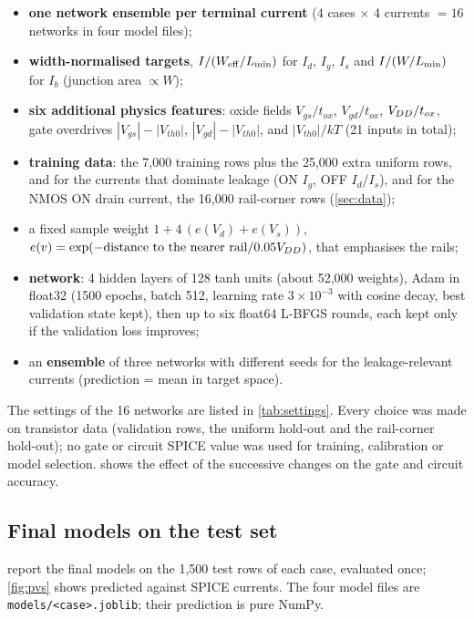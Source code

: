 \begin{itemize}
  \item \textbf{one network ensemble per terminal current} ($4$ cases $\times$ $4$ currents $=16$ networks in four model files);
  \item \textbf{width-normalised targets}, $I/(W_{\mathrm{eff}}/L_{\min})$ for $I_d$, $I_g$, $I_s$ and $I/(W/L_{\min})$ for $I_b$ (junction area $\propto W$);
  \item \textbf{six additional physics features}: oxide fields $V_{gs}/t_{ox}$, $V_{gd}/t_{ox}$, $V_{DD}/t_{ox}$, gate overdrives $|V_{gs}|-|V_{th0}|$,
        $|V_{gd}|-|V_{th0}|$, and $|V_{th0}|/kT$ (21 inputs in total);
  \item \textbf{training data}: the 7{,}000 training rows plus the 25{,}000 extra uniform rows, and for the currents that dominate leakage
        (ON $I_g$, OFF $I_d/I_s$), and for the NMOS ON drain current, the 16{,}000 rail-corner rows (\cref{sec:data});
  \item a fixed sample weight $1+4\,(e(V_d)+e(V_s))$, $e(v)=\exp(-\text{distance to the nearer rail}/0.05V_{DD})$, that emphasises the rails;
  \item \textbf{network}: 4 hidden layers of 128 tanh units (about 52{,}000 weights), Adam in float32 (1500 epochs, batch 512, learning rate
        $3\times10^{-3}$ with cosine decay, best validation state kept), then up to six float64 L-BFGS rounds, each kept only if the validation loss improves;
  \item an \textbf{ensemble} of three networks with different seeds for the leakage-relevant currents (prediction = mean in target space).
\end{itemize}
The settings of the 16 networks are listed in \cref{tab:settings}. Every choice was made on transistor data (validation rows, the uniform hold-out and the
rail-corner hold-out); no gate or circuit SPICE value was used for training, calibration or model selection.  shows the effect of
the successive changes on the gate and circuit accuracy.



\subsection{Final models on the test set}\label{sec:test}
 report the final models on the 1{,}500 test rows of each case, evaluated once; \cref{fig:pvs} shows predicted
against SPICE currents. The four model files are \texttt{models/<case>.joblib}; their prediction is pure NumPy.



